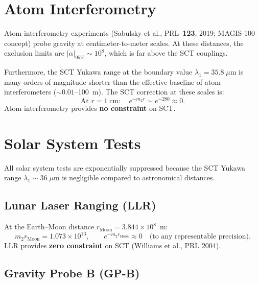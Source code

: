 \documentclass[11pt,a4paper]{article}
\begin{document}
\section{Atom Interferometry}
\label{sec:atom-interf}

Atom interferometry experiments (Sabulsky et al., PRL~\textbf{123}, 2019;
MAGIS-100 concept) probe gravity at centimeter-to-meter scales. At these
distances, the exclusion limits are $|\alpha|_{\text{95\%}} \sim 10^8$,
which is far above the SCT couplings.

Furthermore, the SCT Yukawa range at the boundary value $\lambda_1 = 35.8\;\mu$m
is many orders of magnitude shorter than the effective baseline of atom
interferometers ($\sim 0.01$--100~m). The SCT correction at these scales is:
\begin{equation}
  \text{At } r = 1\;\text{cm}: \quad
  e^{-m_2 r} \sim e^{-280} \approx 0.
\end{equation}
Atom interferometry provides \textbf{no constraint} on SCT.

\section{Solar System Tests}
\label{sec:solar-system}

All solar system tests are exponentially suppressed because the SCT Yukawa
range $\lambda_1 \sim 36\;\mu$m is negligible compared to astronomical
distances.

\subsection{Lunar Laser Ranging (LLR)}

At the Earth--Moon distance $r_{\text{Moon}} = 3.844 \times 10^{8}$~m:
\begin{equation}
  m_2 r_{\text{Moon}} = 1.073 \times 10^{13}, \qquad
  e^{-m_2 r_{\text{Moon}}} \approx 0
  \quad \text{(to any representable precision)}.
\end{equation}
LLR provides \textbf{zero constraint} on SCT (Williams et al., PRL 2004).

\subsection{Gravity Probe B (GP-B)}
\end{document}
